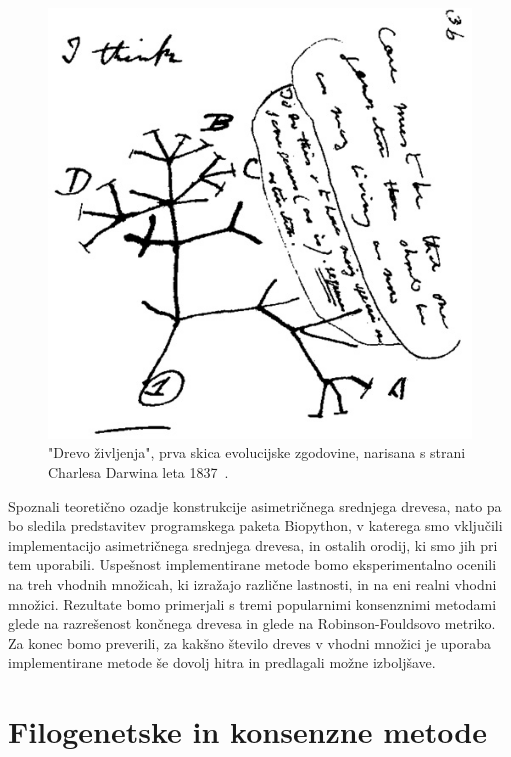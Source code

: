 \documentclass[a4paper, 12pt]{book}
\begin{document}
\begin{figure}
	\begin{center}
		\includegraphics[scale=0.45]{gfx/darwin_tree.jpg}
	\end{center}
	\caption{"Drevo življenja", prva skica evolucijske zgodovine, narisana s strani Charlesa Darwina leta 1837~\cite{cd}.}
	\label{img-darwin-tree}
\end{figure}

Spoznali teoretično ozadje konstrukcije asimetričnega srednjega drevesa, nato pa bo 
sledila predstavitev programskega paketa Biopython, v katerega smo
vključili implementacijo asimetričnega srednjega drevesa, in ostalih orodij, ki smo
jih pri tem uporabili. Uspešnost implementirane metode bomo eksperimentalno ocenili
na treh vhodnih množicah, ki izražajo različne lastnosti, in na eni realni vhodni 
množici. Rezultate bomo primerjali s tremi popularnimi konsenznimi metodami glede
na razrešenost končnega drevesa in glede na Robinson-Fouldsovo metriko. 
Za  konec bomo preverili, za kakšno število dreves v vhodni množici je uporaba
implementirane metode še dovolj hitra in predlagali možne izboljšave.


\chapter{Filogenetske in konsenzne metode}
\end{document}
